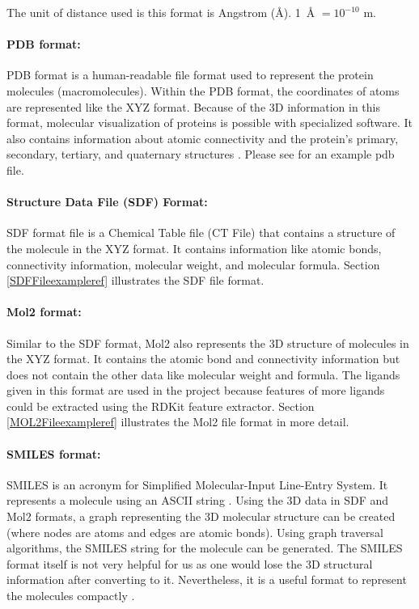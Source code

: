 \documentclass[11pt]{article}
\begin{document}
The unit of distance used is this format is Angstrom (\si{\angstrom}).  \SI{1}{\angstrom} $ = 10^{-10}$ m.
\cite{XYZ_format}

\paragraph{PDB format:}
PDB format is a human-readable file format used to represent the protein molecules (macromolecules).
Within the PDB format,  the coordinates of atoms are represented like the XYZ format.
Because of the 3D information in this format,  molecular visualization of proteins is possible with specialized software. 
It also contains information about atomic connectivity and the protein's primary,  secondary,  tertiary,  and quaternary structures
\cite{pdb_file_format}
\cite{understanding_pdb_format}.
Please see \cite{examplePDBFile} for an example pdb file.


\paragraph{Structure Data File (SDF) Format:}
SDF format file is a Chemical Table file (CT File) that contains a structure of the molecule in the XYZ format.
It contains information like atomic bonds,  connectivity information,  molecular weight,  and molecular formula. \cite{SDFformat}
Section \ref{SDFFileexampleref} illustrates the SDF file format.

\paragraph{Mol2 format:}
Similar to the SDF format,  Mol2 also represents the 3D structure of molecules in the XYZ format.
It contains the atomic bond and connectivity information but does not contain the other data like molecular weight and formula.
The ligands given in this format are used in the project because features of more ligands could be extracted using the RDKit feature extractor.
Section \ref{MOL2Fileexampleref} illustrates the Mol2 file format in more detail.

\paragraph{SMILES format:}
SMILES is an acronym for Simplified Molecular-Input Line-Entry System.
It represents a molecule using an ASCII string \cite{smilesformatresearchpaper}.
Using the 3D data in SDF and Mol2 formats, a graph representing the 3D molecular structure can be created (where nodes are atoms and edges are atomic bonds).
Using graph traversal algorithms, the SMILES string for the molecule can be generated.
The SMILES format itself is not very helpful for us as one would lose the 3D structural information after converting to it.
Nevertheless, it is a useful format to represent the molecules compactly
\cite{smilesformat}.
\end{document}
